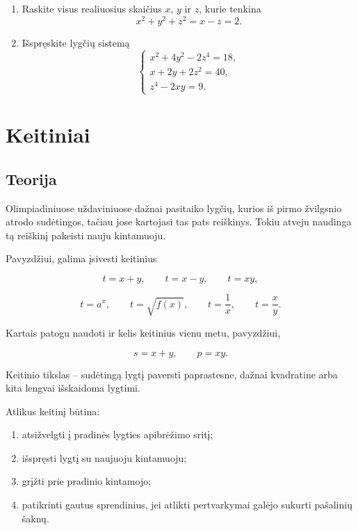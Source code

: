 \documentclass[11pt,a4paper]{scrartcl}
\begin{document}
\begin{enumerate}
    \item Raskite visus realiuosius skaičius $x$, $y$ ir $z$, kurie tenkina
    \[
    x^2+y^2+z^2=x-z=2.
    \]

    \item Išspręskite lygčių sistemą
    \[
    \left\{
    \begin{array}{l}
    x^2+4y^2-2z^4=18,\\
    x+2y+2z^2=40,\\
    z^4-2xy=9.
    \end{array}
    \right.
    \]

\end{enumerate}


\section{Keitiniai}

\subsection{Teorija}

Olimpiadiniuose uždaviniuose dažnai pasitaiko lygčių, kurios iš pirmo
žvilgsnio atrodo sudėtingos, tačiau jose kartojasi tas pats reiškinys.
Tokiu atveju naudinga tą reiškinį pakeisti nauju kintamuoju.

Pavyzdžiui, galima įsivesti keitinius

\[
t=x+y,\qquad
t=x-y,\qquad
t=xy,
\]

\[
t=a^x,\qquad
t=\sqrt{f(x)},\qquad
t=\frac1x,\qquad
t=\frac{x}{y}.
\]

Kartais patogu naudoti ir kelis keitinius vienu metu, pavyzdžiui,

\[
s=x+y,\qquad p=xy.
\]

Keitinio tikslas -- sudėtingą lygtį paversti paprastesne, dažnai
kvadratine arba kita lengvai išskaidoma lygtimi.

Atlikus keitinį būtina:

\begin{enumerate}
    \item atsižvelgti į pradinės lygties apibrėžimo sritį;
    \item išspręsti lygtį su naujuoju kintamuoju;
    \item grįžti prie pradinio kintamojo;
    \item patikrinti gautus sprendinius, jei atlikti pertvarkymai galėjo sukurti pašalinių šaknų.
\end{enumerate}
\end{document}
